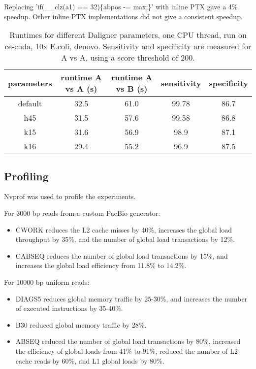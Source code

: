 \documentclass[../main/thesis.tex]{subfiles}
\begin{document}
Replacing 'if(\_\_clz(a1) == 32)\{abpos -= max;\}' with inline PTX gave a 4\% speedup.
Other inline PTX implementations did not give a consistent speedup.


\begin{table}
\centering
\caption{Runtimes for different Daligner parameters, one CPU thread, run on ce-cuda, 10x E.coli, denovo. Sensitivity and specificity are measured for A vs A, using a score threshold of 200.}
\label{tbl:daligner5}
\begin{tabular}{c|cccc}
parameters & runtime A vs A (s) & runtime A vs B (s) & sensitivity & specificity \\ \hline
default & 32.5 & 61.0 & 99.78 & 86.7 \\
h45  & 31.5 & 57.6 & 99.58 & 86.8 \\
k15  & 31.6 & 56.9 & 98.9 & 87.1 \\
k16  & 29.4 & 55.2 & 96.9 & 87.5 \\
\end{tabular}
\end{table}

\newpage

\subsection{Profiling}
Nvprof \cite{nvprof} was used to profile the experiments.

For 3000 bp reads from a custom PacBio generator:
\begin{itemize}
\item CWORK reduces the L2 cache misses by 40\%, increases the global load throughput by 35\%, and the number of global load transactions by 12\%. \vspace{-10pt}
\item CABSEQ reduces the number of global load transactions by 15\%, and increases the global load efficiency from 11.8\% to 14.2\%.
\end{itemize}

For 10000 bp uniform reads:
\begin{itemize}
\item DIAGS5 reduces global memory traffic by 25-30\%, and increases the number of executed instructions by 35-40\%. \vspace{-10pt}
\item B30 reduced global memory traffic by 28\%. \vspace{-10pt}
\item ABSEQ reduced the number of global load transactions by 80\%, increased the efficiency of global loads from 41\% to 91\%, reduced the number of L2 cache reads by 60\%, and L1 global loads by 80\%.
\end{itemize}
\end{document}
